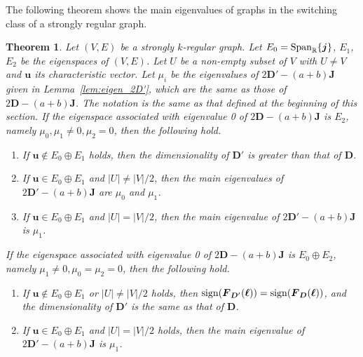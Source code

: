\documentclass[a4paper, 11pt]{article}
\newcommand{\J}{\boldsymbol{J}}
\newcommand{\D}{\boldsymbol{D}}
\newcommand{\F}{\boldsymbol{F}}
\newcommand{\jv}{\boldsymbol{j}}
\newcommand{\uv}{\boldsymbol{u}}
\newcommand{\el}{\boldsymbol{\ell}}
\newtheorem{theorem}{Theorem}[section]
\theoremstyle{definition}
\begin{document}
The following theorem shows the main eigenvalues of graphs in the switching class of a strongly regular graph. 
\begin{theorem} \label{thm:SRG}
Let $(V,E)$ be a strongly $k$-regular graph. Let $E_0={\rm Span}_{\mathbb{R}}\{ \jv \} $, $E_1$, $E_2$ be the eigenspaces of $(V,E)$.
Let $U$ be a non-empty subset of $V$ with $U\ne V$ and $\uv$ its characteristic vector. 
 Let $\mu_i$ be the eigenvalues of  $2\D'-(a+b)\J$ given in Lemma~\ref{lem:eigen_2D'}, which are the same as those of   $2\D-(a+b)\J$. 
 The notation is the same as that defined at the beginning of this section. 
If the eigenspace associated with eigenvalue 0 of $2\D-(a+b)\J$ is $E_2$, namely $\mu_0,\mu_1 \ne 0, \mu_2=0$, then the following hold. 
\begin{enumerate}
\item If $\uv \not\in E_0 \oplus E_1$ holds,
then the dimensionality of $\D'$ is greater than that of $\D$. 
\item If $\uv \in E_0 \oplus E_1$ and $|U|\ne |V|/2$, then the main eigenvalues of $2\D'-(a+b)\J$
 are $\mu_0$ and $\mu_1$. 
\item If $\uv \in E_0 \oplus E_1$ and $|U|= |V|/2$, then the main eigenvalue of $2 \D'-(a+b)\J$ is $\mu_1$. 
\end{enumerate}
If the eigenspace associated with eigenvalue 0 of $2\D-(a+b)\J$ is $E_0 \oplus E_2$, namely $\mu_1 \ne 0, \mu_0=\mu_2=0$, then the following hold. 
\begin{enumerate}
\item[{\rm (i)}] If $\uv \not\in E_0 \oplus E_1$ or $|U|\ne |V|/2$ holds,
then ${\rm sign}(\F_{\D'}(\el))={\rm sign}(\F_{\D}(\el))$, and the dimensionality of $\D'$ is the same as that of $\D$. 
\item[{\rm (ii)}] If $\uv \in E_0 \oplus E_1$ and $|U|= |V|/2$ holds, then the main eigenvalue of $2 \D'-(a+b)\J$ is $\mu_1$. 
\end{enumerate} 
\end{theorem}
\end{document}
